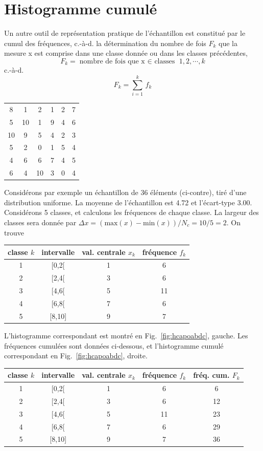 \section{Histogramme cumulé}

Un autre outil de représentation pratique de l'échantillon est constitué par le cumul des fréquences, c.-à-d. la détermination du nombre de fois $F_k$ que la mesure x est comprise dans une classe donnée ou dans les classes précédentes,
$$
F_k=\text{nombre de fois que x $\in$ classes } 1,2,\cdots,k
$$
c.-à-d.
\begin{equation}
F_k=\sum\limits_{i=1}^{k}\,f_k
\end{equation}
\begin{table}
\centering
\vspace{-6mm}
\begin{tabular}{cccccc}
 8 &  1 &  2 &  1 &  2 &  7 \\
 5 & 10 &  1 &  9 &  4 &  6 \\
10 &  9 &  5 &  4 &  2 &  3 \\
 5 &  2 &  0 &  1 &  5 &  4 \\
 4 &  6 &  6 &  7 &  4 &  5 \\
 6 &  4 & 10 &  3 &  0 &  4
\end{tabular}
\end{table}
Considérons par exemple un échantillon de 36 éléments (ci-contre), tiré d'une distribution uniforme. La moyenne de l'échantillon est 4.72 et l'écart-type 3.00. Considérons 5 classes, et calculons les fréquences de chaque classe. La largeur des classes sera donnée par $\Delta x=(\text{max}(x)-\text{min}(x))/N_c=10/5=2$. On trouve
\begin{center}
\begin{tabular}{cccc}
classe $k$ & intervalle & val. centrale $x_k$ & fréquence $f_k$ \\\hline
1 & [0,2[ & 1 & 6 \\
2 & [2,4[ & 3 & 6 \\
3 & [4,6[ & 5 & 11 \\
4 & [6,8[ & 7 & 6 \\
5 & [8,10] & 9 & 7 \\\hline
\end{tabular}
\end{center}
L'histogramme correspondant est montré en Fig.~\ref{fig:hcapoabdc}, gauche. Les fréquences cumulées sont données ci-dessous, et l'histogramme cumulé correspondant en Fig.~\ref{fig:hcapoabdc}, droite.
\begin{center}
\begin{tabular}{ccccc}
classe $k$ & intervalle & val. centrale $x_k$ & fréquence $f_k$ & fréq. cum. $F_k$\\\hline
1 & [0,2[ & 1 & 6 & 6 \\
2 & [2,4[ & 3 & 6 & 12 \\
3 & [4,6[ & 5 & 11 & 23 \\
4 & [6,8[ & 7 & 6 & 29 \\
5 & [8,10] & 9 & 7 & 36\\\hline
\end{tabular}
\end{center}
